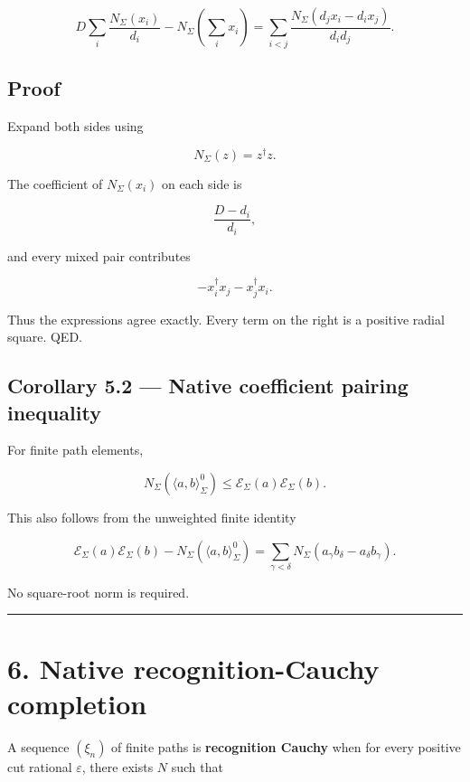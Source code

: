 \[
\boxed{
D\sum_i\frac{N_\Sigma(x_i)}{d_i}
-
N_\Sigma\left(\sum_i x_i\right)
=
\sum_{i<j}
\frac{N_\Sigma(d_jx_i-d_ix_j)}{d_id_j}.
}
\tag{5.1}
\]

\hypertarget{proof-5}{%
\subsection{Proof}\label{proof-5}}

Expand both sides using

\[
N_\Sigma(z)=z^\dagger z.
\]

The coefficient of \(N_\Sigma(x_i)\) on each side is

\[
\frac{D-d_i}{d_i},
\]

and every mixed pair contributes

\[
-x_i^\dagger x_j-x_j^\dagger x_i.
\]

Thus the expressions agree exactly. Every term on the right is a positive
radial square. QED.

\hypertarget{corollary-5.2-native-coefficient-pairing-inequality}{%
\subsection{Corollary 5.2 --- Native coefficient pairing inequality}\label{corollary-5.2-native-coefficient-pairing-inequality}}

For finite path elements,

\[
\boxed{
N_\Sigma(\langle a,b\rangle_\Sigma^0)
\le
\mathcal E_\Sigma(a)\mathcal E_\Sigma(b).
}
\tag{5.2}
\]

This also follows from the unweighted finite identity

\[
\mathcal E_\Sigma(a)\mathcal E_\Sigma(b)
-
N_\Sigma(\langle a,b\rangle_\Sigma^0)
=
\sum_{\gamma<\delta}
N_\Sigma(a_\gamma b_\delta-a_\delta b_\gamma).
\tag{5.3}
\]

No square-root norm is required.

\begin{center}\rule{0.5\linewidth}{0.5pt}\end{center}

\hypertarget{native-recognition-cauchy-completion}{%
\section{6. Native recognition-Cauchy completion}\label{native-recognition-cauchy-completion}}

A sequence \((\xi_n)\) of finite paths is \textbf{recognition Cauchy} when for every
positive cut rational \(\varepsilon\), there exists \(N\) such that

